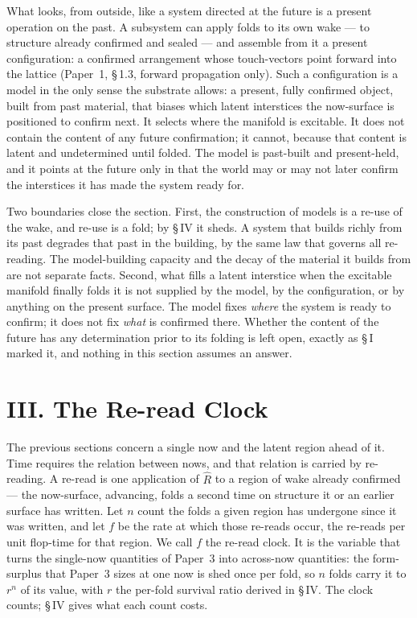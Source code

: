 \documentclass[11pt,oneside]{report}
\theoremstyle{definition}
\theoremstyle{remark}
\begin{document}
What looks, from outside, like a system directed at the future is a
present operation on the past. A subsystem can apply folds to its own
wake --- to structure already confirmed and sealed --- and assemble from
it a present configuration: a confirmed arrangement whose touch-vectors
point forward into the lattice (Paper~1, \S\,1.3, forward propagation
only). Such a configuration is a model in the only sense the substrate
allows: a present, fully confirmed object, built from past material, that
biases which latent interstices the now-surface is positioned to confirm
next. It selects where the manifold is excitable. It does not contain the
content of any future confirmation; it cannot, because that content is
latent and undetermined until folded. The model is past-built and
present-held, and it points at the future only in that the world may or
may not later confirm the interstices it has made the system ready for.

Two boundaries close the section. First, the construction of models is a
re-use of the wake, and re-use is a fold; by \S\,IV it sheds. A system
that builds richly from its past degrades that past in the building, by
the same law that governs all re-reading. The model-building capacity and
the decay of the material it builds from are not separate facts. Second,
what fills a latent interstice when the excitable manifold finally folds
it is not supplied by the model, by the configuration, or by anything on
the present surface. The model fixes \emph{where} the system is ready to
confirm; it does not fix \emph{what} is confirmed there. Whether the
content of the future has any determination prior to its folding is left
open, exactly as \S\,I marked it, and nothing in this section assumes an
answer.

\section*{III. The Re-read Clock}

The previous sections concern a single now and the latent region ahead of
it. Time requires the relation between nows, and that relation is carried
by re-reading. A re-read is one application of \ensuremath{\hat{R}} to a
region of wake already confirmed --- the now-surface, advancing, folds a
second time on structure it or an earlier surface has written. Let
\ensuremath{n} count the folds a given region has undergone since it was
written, and let \ensuremath{f} be the rate at which those re-reads occur,
the re-reads per unit flop-time for that region. We call \ensuremath{f}
the re-read clock. It is the variable that turns the single-now quantities
of Paper~3 into across-now quantities: the form-surplus that Paper~3 sizes
at one now is shed once per fold, so \ensuremath{n} folds carry it to
\ensuremath{r^{n}} of its value, with \ensuremath{r} the per-fold survival
ratio derived in \S\,IV. The clock counts; \S\,IV gives what each count
costs.
\end{document}
